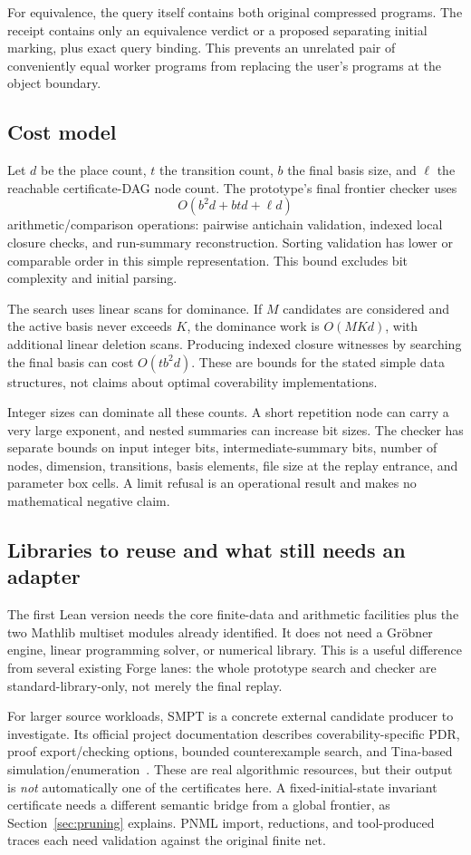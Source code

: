 \documentclass[11pt,a4paper]{article}
\theoremstyle{definition}
\theoremstyle{remark}
\begin{document}
For equivalence, the query itself contains both original compressed programs. The receipt contains only an equivalence verdict or a proposed separating initial marking, plus exact query binding. This prevents an unrelated pair of conveniently equal worker programs from replacing the user's programs at the object boundary.

\subsection{Cost model}
Let $d$ be the place count, $t$ the transition count, $b$ the final basis size, and $\ell$ the reachable certificate-DAG node count. The prototype's final frontier checker uses
\[
 O(b^2d+btd+\ell d)
\]
arithmetic/comparison operations: pairwise antichain validation, indexed local closure checks, and run-summary reconstruction. Sorting validation has lower or comparable order in this simple representation. This bound excludes bit complexity and initial parsing.

The search uses linear scans for dominance. If $M$ candidates are considered and the active basis never exceeds $K$, the dominance work is $O(MKd)$, with additional linear deletion scans. Producing indexed closure witnesses by searching the final basis can cost $O(tb^2d)$. These are bounds for the stated simple data structures, not claims about optimal coverability implementations.

Integer sizes can dominate all these counts. A short repetition node can carry a very large exponent, and nested summaries can increase bit sizes. The checker has separate bounds on input integer bits, intermediate-summary bits, number of nodes, dimension, transitions, basis elements, file size at the replay entrance, and parameter box cells. A limit refusal is an operational result and makes no mathematical negative claim.

\subsection{Libraries to reuse and what still needs an adapter}
The first Lean version needs the core finite-data and arithmetic facilities plus the two Mathlib multiset modules already identified. It does not need a Gr\"obner engine, linear programming solver, or numerical library. This is a useful difference from several existing Forge lanes: the whole prototype search and checker are standard-library-only, not merely the final replay.

For larger source workloads, SMPT is a concrete external candidate producer to investigate. Its official project documentation describes coverability-specific PDR, proof export/checking options, bounded counterexample search, and Tina-based simulation/enumeration~\cite{smpt}. These are real algorithmic resources, but their output is \emph{not} automatically one of the certificates here. A fixed-initial-state invariant certificate needs a different semantic bridge from a global frontier, as Section~\ref{sec:pruning} explains. PNML import, reductions, and tool-produced traces each need validation against the original finite net.
\end{document}
